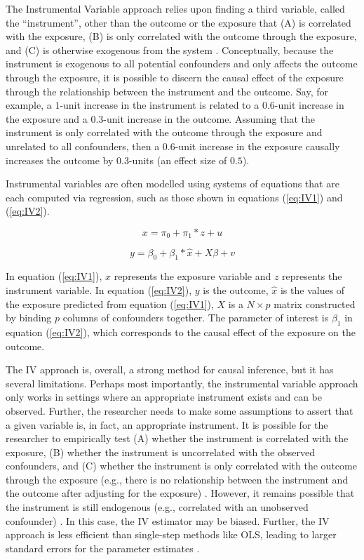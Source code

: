 \documentclass[12pt]{article}
\begin{document}
The Instrumental Variable approach relies upon finding a third variable, called the ``instrument'', other than the outcome or the exposure that (A) is correlated with the exposure, (B) is only correlated with the outcome through the exposure, and (C) is otherwise exogenous from the system \citep{greenlandIntroductionInstrumentalVariables2000}. Conceptually, because the instrument is exogenous to all potential confounders and only affects the outcome through the exposure, it is possible to discern the causal effect of the exposure through the relationship between the instrument and the outcome. Say, for example, a $1$-unit increase in the instrument is related to a $0.6$-unit increase in the exposure and a $0.3$-unit increase in the outcome. Assuming that the instrument is only correlated with the outcome through the exposure and unrelated to all confounders, then a $0.6$-unit increase in the exposure causally increases the outcome by $0.3$-units (an effect size of $0.5$).

Instrumental variables are often modelled using systems of equations that are each computed via regression, such as those shown in equations (\ref{eq:IV1}) and (\ref{eq:IV2}).

\begin{equation}\label{eq:IV1}
x = \pi_0 + \pi_1*z + u
\end{equation}

\begin{equation}\label{eq:IV2}
y = \beta_0 + \beta_1*\hat{x} + X\beta + v
\end{equation}

In equation (\ref{eq:IV1}), $x$ represents the exposure variable and $z$ represents the instrument variable. In equation (\ref{eq:IV2}), $y$ is the outcome, $\hat{x}$ is the values of the exposure predicted from equation (\ref{eq:IV1}), $X$ is a $N \times p$ matrix constructed by binding $p$ columns of confounders together. The parameter of interest is $\beta_1$ in equation (\ref{eq:IV2}), which corresponds to the causal effect of the exposure on the outcome.

The IV approach is, overall, a strong method for causal inference, but it has several limitations. Perhaps most importantly, the instrumental variable approach only works in settings where an appropriate instrument exists and can be observed. Further, the researcher needs to make some assumptions to assert that a given variable is, in fact, an appropriate instrument. It is possible for the researcher to empirically test (A) whether the instrument is correlated with the exposure, (B) whether the instrument is uncorrelated with the observed confounders, and (C) whether the instrument is only correlated with the outcome through the exposure (e.g., there is no relationship between the instrument and the outcome after adjusting for the exposure) \citep{zhangInstrumentalVariableAnalysis2018}. However, it remains possible that the instrument is still endogenous (e.g., correlated with an unobserved confounder) \citep{bascleControllingEndogeneityInstrumental2008}. In this case, the IV estimator may be biased. Further, the IV approach is less efficient than single-step methods like OLS, leading to larger standard errors for the parameter estimates \citep{semadeniPerilsEndogeneityInstrumental2014}.
\end{document}
